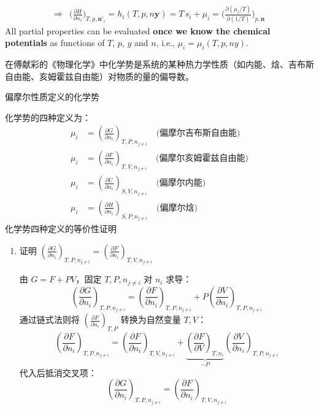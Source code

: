 \begin{thm}
\begin{align*}
        \Rightarrow&\Big(\frac{\partial H}{\partial n_i}\Big)_{T,p,\boldsymbol{n}'_i} = h_i(T,p,n\boldsymbol{y}) 
        = T \, s_i + \mu_i = \Big(\frac{\partial(\mu_i/T)}{\partial(1/T)}\Big)_{p,\boldsymbol{n}} 
    \end{align*}
    All partial properties can be evaluated \textbf{once we know 
    the chemical potentials} as functions of \( T \), \( p \), \( y \) and \( n \), 
    i.e., \( \mu_i = \mu_i(T, p, ny) \).
    \begin{zhu}
        在傅献彩的《物理化学》中化学势是系统的某种热力学性质（如内能、焓、吉布斯自由能、亥姆霍兹自由能）对物质的量的偏导数。
    \end{zhu}
\end{thm}
\begin{add}
偏摩尔性质定义的化学势

化学势的四种定义为：
\begin{align}
\mu_i &= \left( \frac{\partial G}{\partial n_i} \right)_{T, P, n_{j \neq i}} \quad \text{(偏摩尔吉布斯自由能)} \\
\mu_i &= \left( \frac{\partial F}{\partial n_i} \right)_{T, V, n_{j \neq i}} \quad \text{(偏摩尔亥姆霍兹自由能)} \\
\mu_i &= \left( \frac{\partial U}{\partial n_i} \right)_{S, V, n_{j \neq i}} \quad \text{(偏摩尔内能)} \\
\mu_i &= \left( \frac{\partial H}{\partial n_i} \right)_{S, P, n_{j \neq i}} \quad \text{(偏摩尔焓)}
\end{align}
化学势四种定义的等价性证明
\begin{enumerate}
\item 证明 \(\left( \frac{\partial G}{\partial n_i} \right)_{T, P, n_{j \neq i}} 
= \left( \frac{\partial F}{\partial n_i} \right)_{T, V, n_{j \neq i}}\)

由 \(G = F + PV\)，固定 \(T, P, n_{j \neq i}\) 对 \(n_i\) 求导：
\[
\left( \frac{\partial G}{\partial n_i} \right)_{T, P, n_{j \neq i}} 
= \left( \frac{\partial F}{\partial n_i} \right)_{T, P, n_{j \neq i}} 
+ P \left( \frac{\partial V}{\partial n_i} \right)_{T, P, n_{j \neq i}}
\]
通过链式法则将 \(\left( \frac{\partial F}{\partial n_i} \right)_{T, P}\) 转换为自然变量 \(T, V\)：
\[
\left( \frac{\partial F}{\partial n_i} \right)_{T, P, n_{j \neq i}} 
= \left( \frac{\partial F}{\partial n_i} \right)_{T, V, n_{j \neq i}} 
+ \underbrace{\left( \frac{\partial F}{\partial V} \right)_{T, n_i}}_{-P} 
\left( \frac{\partial V}{\partial n_i} \right)_{T, P, n_{j \neq i}}
\]
代入后抵消交叉项：
\[
\left( \frac{\partial G}{\partial n_i} \right)_{T, P, n_{j \neq i}} 
= \left( \frac{\partial F}{\partial n_i} \right)_{T, V, n_{j \neq i}}
\]


\end{enumerate}
\end{add}
